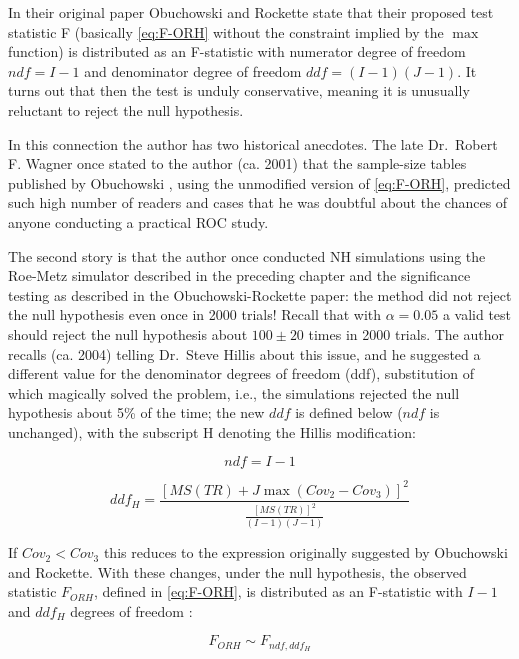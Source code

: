 \documentclass[
]{book}
\begin{document}
In their original paper \citep{RN1450} Obuchowski and Rockette state that their proposed test statistic F (basically \eqref{eq:F-ORH} without the constraint implied by the \(\max\) function) is distributed as an F-statistic with numerator degree of freedom \(ndf=I-1\) and denominator degree of freedom \(ddf=(I-1)(J-1)\). It turns out that then the test is unduly conservative, meaning it is unusually reluctant to reject the null hypothesis.

In this connection the author has two historical anecdotes. The late Dr.~Robert F. Wagner once stated to the author (ca. 2001) that the sample-size tables published by Obuchowski \citep{RN1971, RN1972}, using the unmodified version of \eqref{eq:F-ORH}, predicted such high number of readers and cases that he was doubtful about the chances of anyone conducting a practical ROC study.

The second story is that the author once conducted NH simulations using the Roe-Metz simulator described in the preceding chapter and the significance testing as described in the Obuchowski-Rockette paper: the method did not reject the null hypothesis even once in 2000 trials! Recall that with \(\alpha = 0.05\) a valid test should reject the null hypothesis about \(100\pm20\) times in 2000 trials. The author recalls (ca. 2004) telling Dr.~Steve Hillis about this issue, and he suggested a different value for the denominator degrees of freedom (ddf), substitution of which magically solved the problem, i.e., the simulations rejected the null hypothesis about 5\% of the time; the new \(ddf\) is defined below (\(ndf\) is unchanged), with the subscript H denoting the Hillis modification:

\begin{equation}
ndf=I-1
\label{eq:ndf}
\end{equation}

\begin{equation}
ddf_H=\frac{\left [ MS(TR) + J \max(Cov_2-Cov_3)\right ]^2}{\frac{\left [ MS(TR) \right ]^2}{(I-1)(J-1)}}
\label{eq:ddfH}
\end{equation}

If \(Cov_2<Cov_3\) this reduces to the expression originally suggested by Obuchowski and Rockette. With these changes, under the null hypothesis, the observed statistic \(F_{ORH}\), defined in \eqref{eq:F-ORH}, is distributed as an F-statistic with \(I-1\) and \(ddf_H\) degrees of freedom \citep{RN1772, RN1865, RN1866}:

\begin{equation}
F_{ORH}\sim F_{ndf,ddf_H}
\label{eq:SamplingDistrF-ORH}
\end{equation}
\end{document}
